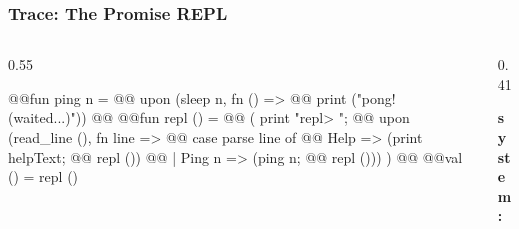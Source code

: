 \begin{frame}[fragile]
  \frametitle{Trace: The Promise REPL}

  \begin{columns}[T]
    \begin{column}{0.55\textwidth}
      \begin{codeblock}[escapechar=@, basicstyle=\footnotesize\ttfamily]
@@fun ping n =
@@  upon (sleep n, fn () =>
@@    print ("pong! (waited...)"))
@@
@@fun repl () =
@@  ( print "repl> ";
@@    upon (read_line (), fn line =>
@@      case parse line of
@@        Help => (print helpText;
@@                 repl ())
@@      | Ping n => (ping n;
@@                   repl ())) )
@@
@@val () = repl ()
\end{codeblock}
    \end{column}
    \begin{column}{0.41\textwidth}
      {\scriptsize
      \colorbox{highlightColor}{\parbox{0.95\linewidth}{%
        \textbf{system:} \textit{\TraceNotif}}}

      \vspace{4pt}

      \vspace{4pt}
      }
    \end{column}
  \end{columns}

  \vspace{2pt}
  {\scriptsize
  }
  \vspace{-6pt}
\end{frame}
